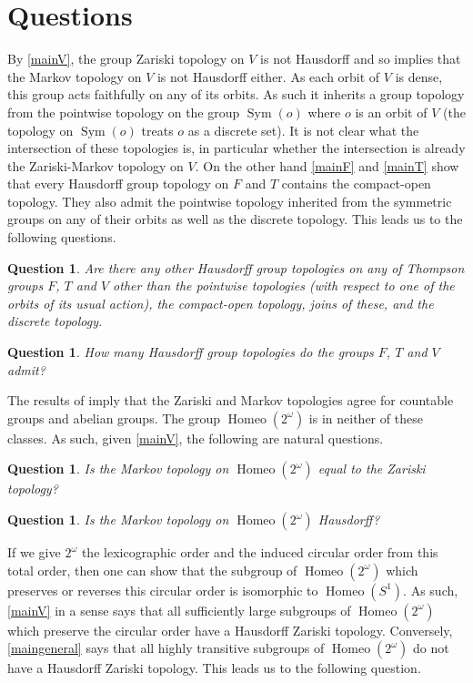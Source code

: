 \documentclass[11pt]{amsart}
\newtheorem{question}[theorem]{Question}
\begin{document}
\section{Questions}
By \cref{mainV}, the group Zariski topology on \(V\) is not Hausdorff and so \cite{markov1946unconditionally} implies that the Markov topology on \(V\) is not Hausdorff either.
As each orbit of \(V\) is dense, this group acts faithfully on any of its orbits. 
As such it inherits a group topology from the pointwise topology on the group \(\operatorname{Sym}(o)\) where \(o\) is an orbit of \(V\) (the topology on \(\operatorname{Sym}(o)\) treats \(o\) as a discrete set).
It is not clear what the intersection of these topologies is, in particular whether the intersection is already the Zariski-Markov topology on \(V\).
On the other hand \cref{mainF} and \cref{mainT} show that every Hausdorff group topology on \(F\) and \(T\) contains the compact-open topology.
They also admit the pointwise topology inherited from the symmetric groups on any of their orbits as well as the discrete topology. This leads us to the following questions.
\begin{question}
    Are there any other Hausdorff group topologies on any of Thompson groups \(F\), \(T\) and \(V\) other than the pointwise topologies (with respect to one of the orbits of its usual action), the compact-open topology, joins of these, and the discrete topology.
\end{question}
\begin{question}
    How many Hausdorff group topologies do the groups \(F\), \(T\) and \(V\) admit?
\end{question}
The results of \cite{markov1946unconditionally, DDSabelianzariski} imply that the Zariski and Markov topologies agree for countable groups and abelian groups. 
The group \(\operatorname{Homeo}(2^\omega)\) is in neither of these classes. As such, given \cref{mainV}, the following are natural questions.
\begin{question}
Is the Markov topology on \(\operatorname{Homeo}(2^\omega)\) equal to the Zariski topology?
\end{question}
\begin{question}
      Is the Markov topology on \(\operatorname{Homeo}(2^\omega)\) Hausdorff?
\end{question}

If we give \(2^\omega\) the lexicographic order and the induced circular order from this total order, then one can show that the subgroup of \(\operatorname{Homeo}(2^\omega)\) which preserves or reverses this circular order is isomorphic to \(\operatorname{Homeo}(S^1)\).
As such, \cref{mainV} in a sense says that all sufficiently large subgroups of \(\operatorname{Homeo}(2^\omega)\) which preserve the circular order have a Hausdorff Zariski topology.
Conversely, \cref{maingeneral} says that all highly transitive subgroups of \(\operatorname{Homeo}(2^\omega)\) do not have a Hausdorff Zariski topology. This leads us to the following question.
\end{document}
